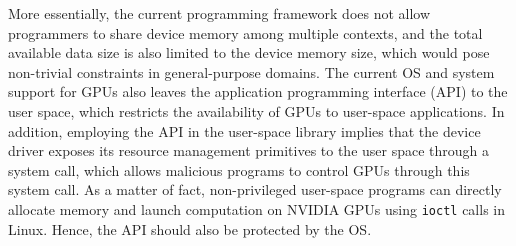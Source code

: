 More essentially, the current programming framework does not allow
programmers to share device memory among multiple contexts, and the
total available data size is also limited to the device memory size,
which would pose non-trivial constraints in general-purpose domains.
The current OS and system support for GPUs also leaves the
application programming interface (API) to the user space, which
restricts the availability of GPUs to user-space applications.
In addition, employing the API in the user-space library implies that
the device driver exposes its resource management primitives to the user
space through a system call, which allows malicious programs to control
GPUs through this system call. 
As a matter of fact, non-privileged user-space programs can directly
allocate memory and launch computation on NVIDIA GPUs using
\texttt{ioctl} calls in Linux.
Hence, the API should also be protected by the OS.

